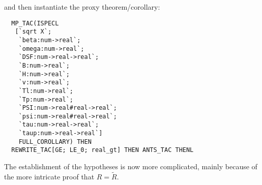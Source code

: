 \documentclass[10pt]{article}
\theoremstyle{definition}
\theoremstyle{remark}
\numberwithin{equation}{section}
\begin{document}
\noindent and then instantiate the proxy theorem/corollary:

\begin{scriptsize}\begin{verbatim}
  MP_TAC(ISPECL
   [`sqrt X`;
    `beta:num->real`;
    `omega:num->real`;
    `DSF:num->real->real`;
    `B:num->real`;
    `H:num->real`;
    `v:num->real`;
    `Tl:num->real`;
    `Tp:num->real`;
    `PSI:num->real#real->real`;
    `psi:num->real#real->real`;
    `tau:num->real->real`;
    `taup:num->real->real`]
    FULL_COROLLARY) THEN
  REWRITE_TAC[GE; LE_0; real_gt] THEN ANTS_TAC THENL
\end{verbatim}\end{scriptsize}

The establishment of the hypotheses is now more complicated, mainly because of
the more intricate proof that $R = \tilde{R}$.
\end{document}
